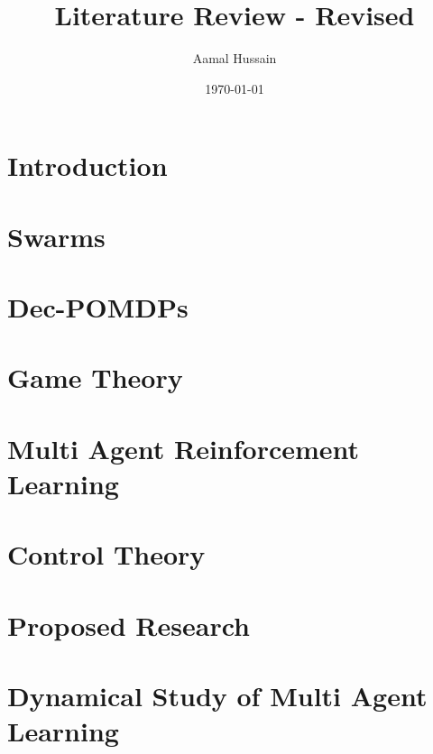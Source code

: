 \documentclass[11pt]{report}
\title{Literature Review - Revised}
\author{Aamal Hussain}
\date{\today}
\begin{document}
\maketitle 

\tableofcontents

\chapter{Introduction}  \label{ch::Intro}

\chapter{Swarms}  \label{ch::Swarms}

\chapter{Dec-POMDPs}  \label{ch::Dec-POMDPs}

\chapter{Game Theory}  \label{ch::GameTheory}

\chapter{Multi Agent Reinforcement Learning}  \label{ch::MARL}

\chapter{Control Theory}  \label{ch::ControlTheory}

\chapter{Proposed Research}  \label{ch::Proposals}

\chapter{Dynamical Study of Multi Agent Learning}

 


\end{document}
